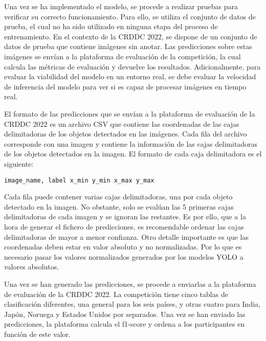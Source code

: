 Una vez se ha implementado el modelo, se procede a realizar pruebas para verificar su correcto funcionamiento. Para ello, se utiliza el conjunto de datos de prueba, el cual no ha sido utilizado en ninguna etapa del proceso de entrenamiento. En el contexto de la CRDDC 2022, se dispone de un conjunto de datos de prueba que contiene imágenes sin anotar. Las predicciones sobre estas imágenes se envían a la plataforma de evaluación de la competición, la cual calcula las métricas de evaluación y devuelve los resultados. Adicionalmente, para evaluar la viabilidad del modelo en un entorno real, se debe evaluar la velocidad de inferencia del modelo para ver si es capaz de procesar imágenes en tiempo real.

El formato de las predicciones que se envían a la plataforma de evaluación de la CRDDC 2022 es un archivo CSV que contiene las coordenadas de las cajas delimitadoras de los objetos detectados en las imágenes. Cada fila del archivo corresponde con una imagen y contiene la información de las cajas delimitadoras de los objetos detectados en la imagen. El formato de cada caja delimitadora es el siguiente:

\begin{center}
    \texttt{image\_name, label x\_min y\_min x\_max y\_max}
\end{center}

Cada fila puede contener varias cajas delimitadoras, una por cada objeto detectado en la imagen. No obstante, solo se evalúan las 5 primeras cajas delimitadoras de cada imagen y se ignoran las restantes. Es por ello, que a la hora de generar el fichero de predicciones, es recomendable ordenar las cajas delimitadoras de mayor a menor confianza. Otro detalle importante es que las coordenadas deben estar en valor absoluto y no normalizadas. Por lo que es necesario pasar los valores normalizados generados por los modelos YOLO a valores absolutos.

Una vez se han generado las predicciones, se procede a enviarlas a la plataforma de evaluación de la CRDDC 2022. La competición tiene cinco tablas de clasificación diferentes, una general para los seis países, y otras cuatro para India, Japón, Noruega y Estados Unidos por separados. Una vez se han enviado las predicciones, la plataforma calcula el f1-score y ordena a los participantes en función de este valor.
